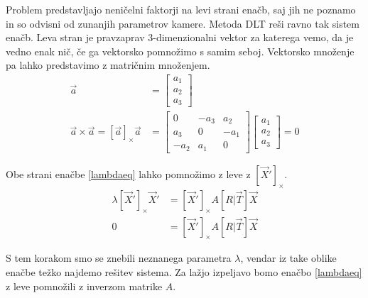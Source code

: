 \documentclass[a4paper, 12pt]{book}
\begin{document}
Problem predstavljajo neničelni faktorji na levi strani enačb, saj jih ne poznamo in so odvisni od zunanjih parametrov kamere. Metoda DLT reši ravno tak sistem enačb. Leva stran je pravzaprav 3-dimenzionalni vektor za katerega vemo, da je vedno enak nič, če ga vektorsko pomnožimo s samim seboj. Vektorsko množenje pa lahko predstavimo z matričnim množenjem.
\begin{align}
\vec{a} &= 
\begin{bmatrix}
a_1 \\
a_2 \\
a_3
\end{bmatrix} \\
\vec{a} \times \vec{a} = [\vec{a}]_{\times} \vec{a} &= 
\begin{bmatrix}
0 & -a_3 & a_2 \\
a_3 & 0 & -a_1 \\
-a_2 & a_1 & 0
\end{bmatrix}
\begin{bmatrix}
a_1 \\
a_2 \\
a_3
\end{bmatrix} = 0
\end{align}

Obe strani enačbe \eqref{lambdaeq} lahko pomnožimo z leve z $[\vec{X}']_{\times}$.
\begin{align}
\lambda [\vec{X}']_{\times} \vec{X}' &= [\vec{X}']_{\times} A[R | \vec{T}] \vec{X} \\
0 &= [\vec{X}']_{\times} A[R | \vec{T}] \vec{X}
\end{align}

S tem korakom smo se znebili neznanega parametra $\lambda$, vendar iz take oblike enačbe težko najdemo rešitev sistema. Za lažjo izpeljavo bomo enačbo \eqref{lambdaeq} z leve pomnožili z inverzom matrike $A$.
\end{document}
